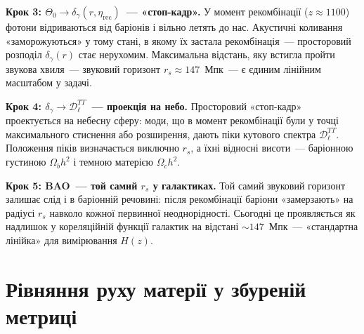 \medskip
\noindent\textbf{Крок 3: $\Theta_0 \to \delta_\gamma(r,\eta_\mathrm{rec})$~--- «стоп-кадр».}
У момент рекомбінації ($z \approx 1100$) фотони відриваються
від баріонів і вільно летять до нас. Акустичні коливання
«заморожуються» у тому стані, в якому їх застала рекомбінація~---
просторовий розподіл $\delta_\gamma(r)$ стає нерухомим.
Максимальна відстань, яку встигла пройти звукова хвиля~---
звуковий горизонт $r_s \approx 147$~Мпк~--- є єдиним
лінійним масштабом у задачі.

\medskip
\noindent\textbf{Крок 4: $\delta_\gamma \to \mathcal{D}_\ell^{TT}$~--- проекція на небо.}
Просторовий «стоп-кадр» проектується на небесну сферу:
моди, що в момент рекомбінації були у точці максимального
стиснення або розширення, дають піки кутового спектра
$\mathcal{D}_\ell^{TT}$. Положення піків визначається
виключно $r_s$, а їхні відносні висоти~--- баріонною
густиною $\Omega_b h^2$ і темною матерією $\Omega_c h^2$.

\medskip
\noindent\textbf{Крок 5: BAO~--- той самий $r_s$ у галактиках.}
Той самий звуковий горизонт залишає слід і в баріонній
речовині: після рекомбінації баріони «замерзають» на
радіусі $r_s$ навколо кожної первинної неоднорідності.
Сьогодні це проявляється як надлишок у кореляційній
функції галактик на відстані $\sim 147$~Мпк~---
«стандартна лінійка» для вимірювання $H(z)$.

\section{Рівняння руху матерії у збуреній метриці}
\label{sec:matter_perturbations}

